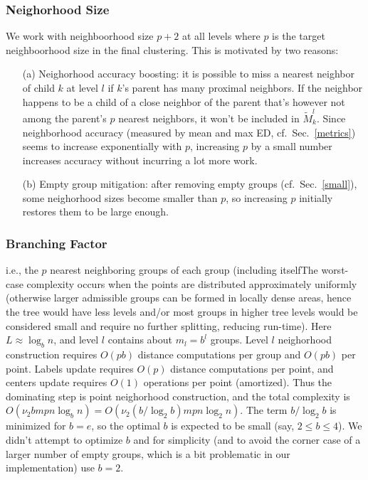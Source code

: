 \documentclass[11pt]{article}
\begin{document}
\subsubsection{Neighorhood Size}
\label{neighborhood_size}
We work with neighboorhood size $p+2$ at all levels where $p$ is the target neighboorhood size in the final clustering. This is motivated by two reasons:
\begin{itemize}
	\item[(a)] Neighorhood accuracy boosting: it is possible to miss a nearest neighbor of child $k$ at level $l$ if $k$'s parent has many proximal neighbors. If the neighbor happens to be a child of a close neighbor of the parent that's however not among the parent's $p$ nearest neighbors, it won't be included in $\tilde{M}^l_k$. Since neighborhood accuracy (measured by mean and max ED, cf.~Sec.~\ref{metrics}) seems to increase exponentially with $p$, increasing $p$ by a small number increases accuracy without incurring a lot more work.
	\item[(b)] Empty group mitigation: after removing empty groups (cf.~Sec.~\ref{small}), some neighorhood sizes become smaller than $p$, so increasing $p$ initially restores them to be large enough.
\end{itemize}	


\subsubsection{Branching Factor}
i.e., the $p$ nearest neighboring groups of each group (including itselfThe worst-case complexity occurs when the points are distributed approximately uniformly (otherwise larger admissible groups can be formed in locally dense areas, hence the tree would have less levels and/or most groups in higher tree levels would be considered small and require no further splitting, reducing run-time). Here $L \approx \log_b n$, and level $l$ contains about $m_l=b^l$ groups. Level $l$ neighorhood construction requires $O(p b)$ distance computations per group and $O(p b)$ per point. Labels update requires $O(p)$ distance computations per point, and centers update requires $O(1)$ operations per point (amortized). Thus the dominating step is point neighorhood construction, and the total complexity is $O(\nu_2 b m p n \log_b n) = O(\nu_2 (b/\log_2 b) m p n \log_2 n)$. The term $b/\log_2 b$ is minimized for $b=e$, so the optimal $b$ is expected to be small (say, $2 \leq b \leq 4$). We didn't attempt to optimize $b$ and for simplicity (and to avoid the corner case of a larger number of empty groups, which is a bit problematic in our implementation) use $b=2$.
\end{document}
